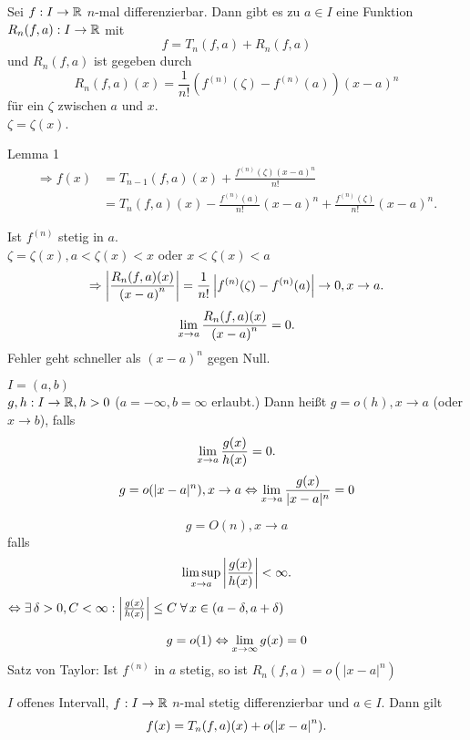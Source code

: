 \documentclass[../ana2.tex]{subfiles}
\begin{document}
\begin{satz}[Taylor]
    Sei \( f:I\rightarrow \mathbb{R} \) \( n \)-mal differenzierbar. Dann gibt es zu
    \( a \in I \) eine Funktion \( R_n(f,a):I\rightarrow \mathbb{R} \) mit
    \[ f = T_n(f, a) + R_n(f,a) \]
    und \( R_n(f,a) \) ist gegeben durch
    \[ R_n(f,a)(x) = \frac{1}{n!} 
    \left( f^{(n)}(\zeta) - f^{(n)}(a) \right) {(x-a)}^n \]
    für ein \( \zeta \) zwischen \( a \) und \( x \). \\
    \( \zeta = \zeta(x) \).
\end{satz}
\begin{bew}
    Lemma 1
    \begin{align*}
        \Rightarrow f(x) &= T_{n-1}(f, a)(x) +
        \frac{ f^{(n)}(\zeta){(x-a)}^n }{ n! } \\
        &= T_n(f,a)(x) - \frac{ f^{(n)}(a) }{n!} {(x-a)}^n 
        + \frac{f^{(n)}(\zeta)}{n!} {(x-a)}^n.
    \end{align*}
\end{bew}
\begin{bem}
    Ist \( f^{(n)} \) stetig in \( a \). \\
    \( \zeta = \zeta(x), a < \zeta(x) < x \) oder \( x < \zeta(x) < a \)
    \[ \Rightarrow \left| \frac{ R_n(f,a)(x) }{ {(x-a)}^n } \right| 
    = \frac{1}{n!} \left| f^{(n)}(\zeta) - f^{(n)}(a) \right| 
    \rightarrow 0, x \rightarrow a. \]
    \[ \lim\limits_{x\rightarrow{}a} \frac{ R_n(f,a)(x) }{ {(x-a)}^n } = 0. \]
    Fehler geht schneller als \( {(x-a)}^n \) gegen Null.
\end{bem}
\begin{defi}
    \( I = (a,b) \) \\
    \( g,h:I\rightarrow \mathbb{R}, h > 0\) (\(a=-\infty, b=\infty \) erlaubt.)
    Dann heißt \( g = o(h), x \rightarrow a \) 
    (oder \( x \rightarrow b \)), falls 
    \[ \lim\limits_{x\rightarrow{}a} \frac{g(x)}{h(x)} = 0. \]
    \zB{} \[ g = o(|x-a|^n), x \rightarrow a 
    \Leftrightarrow \lim\limits_{x\rightarrow{}a} 
    \frac{g(x)}{|x-a|^n} = 0 \]

    \[ g = O(n), x \rightarrow a \]
    falls \[ \limsup\limits_{x\rightarrow{}a} \left|\frac{g(x)}{h(x)}\right| < \infty. \]
    \( \Leftrightarrow \exists \delta > 0, C < \infty: 
    \abs{ \frac{g(x)}{h(x)} } \leq C 
    \;\forall x \in (a - \delta, a + \delta) \)

    \[ g = o(1) \Leftrightarrow \lim\limits_{x\rightarrow\infty} g(x) = 0 \]
    Satz von Taylor: Ist \( f^{(n)} \) in \( a \) stetig, so ist
    \( R_n(f,a) = o(|x-a|^n) \)
\end{defi}
\begin{kor}
    \(I\) offenes Intervall, \( f:I\rightarrow \mathbb{R} \) 
    \(n\)-mal stetig differenzierbar und \(a\in I\). 
    Dann gilt 
    \[ f(x) = T_n(f,a)(x) + o(\left|x-a\right|^n). \]
\end{kor}
\end{document}
